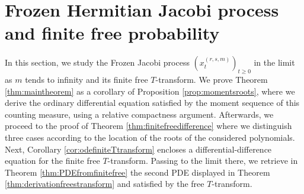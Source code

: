 \documentclass[12pt,reqno]{amsart}
\begin{document}
\section{Frozen Hermitian Jacobi process and finite free probability} \label{sec:frozen}

In this section, we study the Frozen Jacobi process $(x^{(r,s,m)}_t)_{t \geq 0}$ in the limit as $m$ tends to infinity and its finite free $T$-transform. We prove Theorem \ref{thm:maintheorem} as a corollary of Proposition \ref{prop:momentsroots}, where we derive the ordinary differential equation satisfied by the moment sequence of this counting measure, using a relative compactness argument. Afterwards, we proceed to the proof of Theorem \ref{thm:finitefreedifference} where we distinguish three cases according to the location of the roots of the considered polynomials. 
Next, Corollary \ref{cor:odefiniteTtransform} encloses a differential-difference equation for the finite free $T$-transform. Passing to the limit there, we retrieve in Theorem \ref{thm:PDEfromfinitefree} the second PDE displayed in Theorem \ref{thm:derivationfreestransform} and satisfied by the free $T$-transform. 
\end{document}
